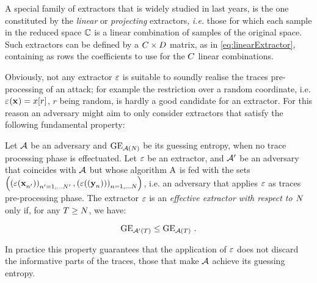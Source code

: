 \begin{example}
A special family of extractors that is widely studied in last years, is the one constituted by the {\em linear} or {\em projecting} extractors, \textit{i.e.} those for which each sample in the reduced space $\mathbb{\newTraceLength}$ is a linear combination of samples of the original space. Such extractors can be defined by a $\newTraceLength \times \traceLength$ matrix, as in \eqref{eq:linearExtractor}, containing as rows the coefficients to use for the $\newTraceLength$ linear combinations. 
\end{example}

Obviously, not any extractor $\extract$ is suitable to soundly realise the traces pre-processing of an attack; for example the restriction over a random coordinate, i.e. $\extractor{\sss[]{}} = x[r]$, $r$ being random, is hardly a good candidate for an extractor. For this reason an adversary might aim to only consider extractors that satisfy the following fundamental property:

\begin{property}
Let $\adversary$ be an adversary and $\guessingEntropy_{\adversary(\numTraces[])}$ be its guessing entropy, when no trace processing phase is effectuated. Let $\extract$ be an extractor, and $\adversary'$ be an adversary that coincides with $\adversary$ but whose algorithm $\attackAlgorithm$ is fed with the sets $ \left( \left(\extract(\sss[]{n'})\right)_{n'=1,\dots \numTraces[]'}, \left(\extract((\sssTest[]{n}))\right)_{n=1,\dots \numTraces[]} \right)$, i.e. an adversary that applies $\extract$ as traces pre-processing phase. The extractor $\extract$ is an {\em effective  extractor with respect to $\numTraces[]$} only if, for any $T \geq\numTraces[] $, we have:

\begin{equation}\label{eq:effective}
\guessingEntropy_{\adversary'(T)} \leq \guessingEntropy_{\adversary(T)}\mbox{ .}
\end{equation}

\end{property}
In practice this property guarantees that the application of $\extract$ does not discard the informative parts of the traces, those that make $\adversary$ achieve its guessing entropy.
















